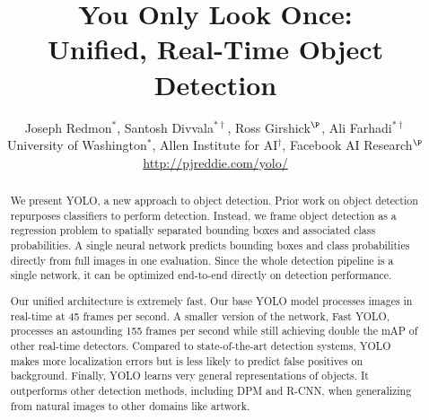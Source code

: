 \documentclass[10pt,twocolumn,letterpaper]{article}
\begin{document}
\title{\vspace{-1cm}You Only Look Once: \\
Unified, Real-Time Object Detection\vspace{-.25cm}}



\author{Joseph Redmon$^*$, Santosh Divvala$^{* \dag}$, Ross Girshick$^\P$, Ali Farhadi$^{* \dag}$\\
\small{University of Washington$^*$, Allen Institute for AI$^\dag$, Facebook AI Research$^\P$}\\ \url{http://pjreddie.com/yolo/}}

\maketitle

\begin{abstract}
\vspace{-.25cm}
We present YOLO, a new approach to object detection. Prior work on object detection repurposes classifiers to perform detection. Instead, we frame object detection as a regression problem to spatially separated bounding boxes and associated class probabilities. A single neural network predicts bounding boxes and class probabilities directly from full images in one evaluation. Since the whole detection pipeline is a single network, it can be optimized end-to-end directly on detection performance.

Our unified architecture is extremely fast. Our base YOLO model processes images in real-time at 45 frames per second. A smaller version of the network, Fast YOLO, processes an astounding 155 frames per second while still achieving double the mAP of other real-time detectors. Compared to state-of-the-art detection systems, YOLO makes more localization errors but is less likely to predict false positives on background. Finally, YOLO learns very general representations of objects. It outperforms other detection methods, including DPM and R-CNN, when generalizing from natural images to other domains like artwork.
\end{abstract}
\end{document}
